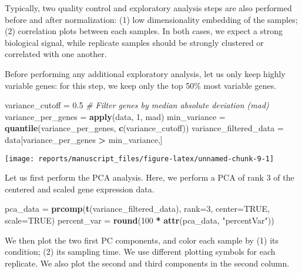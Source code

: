 \documentclass[9pt,a4paper,]{extarticle}
\newenvironment{Shaded}{\begin{snugshade}}{\end{snugshade}}
\newcommand{\CommentTok}[1]{\textcolor[rgb]{0.56,0.35,0.01}{\textit{#1}}}
\newcommand{\DataTypeTok}[1]{\textcolor[rgb]{0.13,0.29,0.53}{#1}}
\newcommand{\DecValTok}[1]{\textcolor[rgb]{0.00,0.00,0.81}{#1}}
\newcommand{\FloatTok}[1]{\textcolor[rgb]{0.00,0.00,0.81}{#1}}
\newcommand{\KeywordTok}[1]{\textcolor[rgb]{0.13,0.29,0.53}{\textbf{#1}}}
\newcommand{\NormalTok}[1]{#1}
\newcommand{\OperatorTok}[1]{\textcolor[rgb]{0.81,0.36,0.00}{\textbf{#1}}}
\newcommand{\OtherTok}[1]{\textcolor[rgb]{0.56,0.35,0.01}{#1}}
\newcommand{\StringTok}[1]{\textcolor[rgb]{0.31,0.60,0.02}{#1}}
\begin{document}
Typically, two quality control and exploratory analysis steps are also
performed before and after normalization: (1) low dimensionality embedding of
the samples; (2) correlation plots between each samples. In both cases, we
expect a strong biological signal, while replicate samples should be strongly
clustered or correlated with one another.

Before performing any additional exploratory analysis, let us only keep highly
variable genes: for this step, we keep only the top 50\% most variable genes.

\begin{Shaded}
\begin{Highlighting}[]
\NormalTok{variance_cutoff =}\StringTok{ }\FloatTok{0.5}
\CommentTok{# Filter genes by median absolute deviation (mad)}
\NormalTok{variance_per_genes =}\StringTok{ }\KeywordTok{apply}\NormalTok{(data, }\DecValTok{1}\NormalTok{, mad)}
\NormalTok{min_variance =}\StringTok{ }\KeywordTok{quantile}\NormalTok{(variance_per_genes, }\KeywordTok{c}\NormalTok{(variance_cutoff))}
\NormalTok{variance_filtered_data =}\StringTok{ }\NormalTok{data[variance_per_genes }\OperatorTok{>}\StringTok{ }\NormalTok{min_variance,]}
\end{Highlighting}
\end{Shaded}

\begin{center}\texttt{[image: reports/manuscript\_files/figure-latex/unnamed-chunk-9-1]} \end{center}

Let us first perform the PCA analysis. Here, we perform a PCA of rank 3 of the
centered and scaled gene expression data.

\begin{Shaded}
\begin{Highlighting}[]
\NormalTok{pca_data =}\StringTok{ }\KeywordTok{prcomp}\NormalTok{(}\KeywordTok{t}\NormalTok{(variance_filtered_data), }\DataTypeTok{rank=}\DecValTok{3}\NormalTok{, }\DataTypeTok{center=}\OtherTok{TRUE}\NormalTok{, }\DataTypeTok{scale=}\OtherTok{TRUE}\NormalTok{) }
\NormalTok{percent_var =}\StringTok{ }\KeywordTok{round}\NormalTok{(}\DecValTok{100} \OperatorTok{*}\StringTok{ }\KeywordTok{attr}\NormalTok{(pca_data, }\StringTok{"percentVar"}\NormalTok{))}
\end{Highlighting}
\end{Shaded}

We then plot the two first PC components, and color each sample by (1) its
condition; (2) its sampling time. We use different plotting symbols for each replicate. We also plot the second and third components in the second column.
\end{document}
